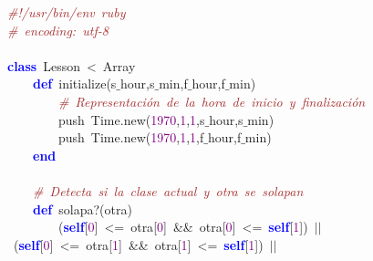 \noindent
\mbox{}\textit{\textcolor{Brown}{\#!/usr/bin/env\ ruby}} \\
\mbox{}\textit{\textcolor{Brown}{\#\ encoding:\ utf-8}} \\
\mbox{} \\
\mbox{}\textbf{\textcolor{Blue}{class}}\ Lesson\ \textcolor{BrickRed}{\textless{}}\ Array \\
\mbox{}\ \ \ \ \textbf{\textcolor{Blue}{def}}\ initialize\textcolor{BrickRed}{(}s$\_$hour\textcolor{BrickRed}{,}s$\_$min\textcolor{BrickRed}{,}f$\_$hour\textcolor{BrickRed}{,}f$\_$min\textcolor{BrickRed}{)} \\
\mbox{}\ \ \ \ \ \ \ \ \textit{\textcolor{Brown}{\#\ Representación\ de\ la\ hora\ de\ inicio\ y\ finalización}} \\
\mbox{}\ \ \ \ \ \ \ \ push\ Time\textcolor{BrickRed}{.}new\textcolor{BrickRed}{(}\textcolor{Purple}{1970}\textcolor{BrickRed}{,}\textcolor{Purple}{1}\textcolor{BrickRed}{,}\textcolor{Purple}{1}\textcolor{BrickRed}{,}s$\_$hour\textcolor{BrickRed}{,}s$\_$min\textcolor{BrickRed}{)} \\
\mbox{}\ \ \ \ \ \ \ \ push\ Time\textcolor{BrickRed}{.}new\textcolor{BrickRed}{(}\textcolor{Purple}{1970}\textcolor{BrickRed}{,}\textcolor{Purple}{1}\textcolor{BrickRed}{,}\textcolor{Purple}{1}\textcolor{BrickRed}{,}f$\_$hour\textcolor{BrickRed}{,}f$\_$min\textcolor{BrickRed}{)} \\
\mbox{}\ \ \ \ \textbf{\textcolor{Blue}{end}} \\
\mbox{}\ \ \ \  \\
\mbox{}\ \ \ \ \textit{\textcolor{Brown}{\#\ Detecta\ si\ la\ clase\ actual\ y\ otra\ se\ solapan}} \\
\mbox{}\ \ \ \ \textbf{\textcolor{Blue}{def}}\ solapa?\textcolor{BrickRed}{(}otra\textcolor{BrickRed}{)} \\
\mbox{}\ \ \ \ \ \ \ \ \textcolor{BrickRed}{(}\textbf{\textcolor{Blue}{self}}\textcolor{BrickRed}{[}\textcolor{Purple}{0}\textcolor{BrickRed}{]}\ \textcolor{BrickRed}{\textless{}=}\ otra\textcolor{BrickRed}{[}\textcolor{Purple}{0}\textcolor{BrickRed}{]}\ \textcolor{BrickRed}{\&\&}\ otra\textcolor{BrickRed}{[}\textcolor{Purple}{0}\textcolor{BrickRed}{]}\ \textcolor{BrickRed}{\textless{}=}\ \textbf{\textcolor{Blue}{self}}\textcolor{BrickRed}{[}\textcolor{Purple}{1}\textcolor{BrickRed}{])}\ \textcolor{BrickRed}{$|$$|$}\ \textcolor{BrickRed}{(}\textbf{\textcolor{Blue}{self}}\textcolor{BrickRed}{[}\textcolor{Purple}{0}\textcolor{BrickRed}{]}\ \textcolor{BrickRed}{\textless{}=}\ otra\textcolor{BrickRed}{[}\textcolor{Purple}{1}\textcolor{BrickRed}{]}\ \textcolor{BrickRed}{\&\&}\ otra\textcolor{BrickRed}{[}\textcolor{Purple}{1}\textcolor{BrickRed}{]}\ \textcolor{BrickRed}{\textless{}=}\ \textbf{\textcolor{Blue}{self}}\textcolor{BrickRed}{[}\textcolor{Purple}{1}\textcolor{BrickRed}{])}\ \textcolor{BrickRed}{$|$$|$} \\
